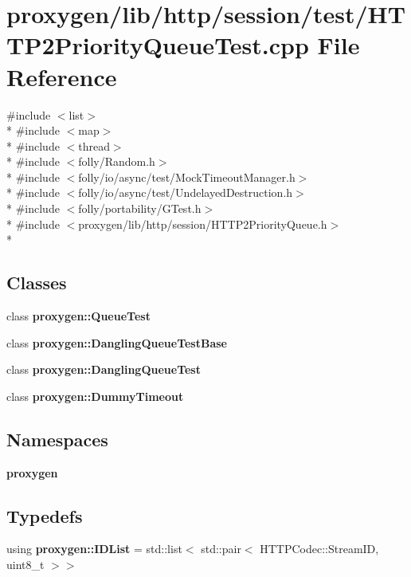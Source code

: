 \section{proxygen/lib/http/session/test/\+H\+T\+T\+P2\+Priority\+Queue\+Test.cpp File Reference}
\label{HTTP2PriorityQueueTest_8cpp}
{\ttfamily \#include $<$list$>$}\\*
{\ttfamily \#include $<$map$>$}\\*
{\ttfamily \#include $<$thread$>$}\\*
{\ttfamily \#include $<$folly/\+Random.\+h$>$}\\*
{\ttfamily \#include $<$folly/io/async/test/\+Mock\+Timeout\+Manager.\+h$>$}\\*
{\ttfamily \#include $<$folly/io/async/test/\+Undelayed\+Destruction.\+h$>$}\\*
{\ttfamily \#include $<$folly/portability/\+G\+Test.\+h$>$}\\*
{\ttfamily \#include $<$proxygen/lib/http/session/\+H\+T\+T\+P2\+Priority\+Queue.\+h$>$}\\*
\subsection*{Classes}
\begin{DoxyCompactItemize}
\item 
class {\bf proxygen\+::\+Queue\+Test}
\item 
class {\bf proxygen\+::\+Dangling\+Queue\+Test\+Base}
\item 
class {\bf proxygen\+::\+Dangling\+Queue\+Test}
\item 
class {\bf proxygen\+::\+Dummy\+Timeout}
\end{DoxyCompactItemize}
\subsection*{Namespaces}
\begin{DoxyCompactItemize}
\item 
 {\bf proxygen}
\end{DoxyCompactItemize}
\subsection*{Typedefs}
\begin{DoxyCompactItemize}
\item 
using {\bf proxygen\+::\+I\+D\+List} = std\+::list$<$ std\+::pair$<$ H\+T\+T\+P\+Codec\+::\+Stream\+ID, uint8\+\_\+t $>$$>$
\end{DoxyCompactItemize}
